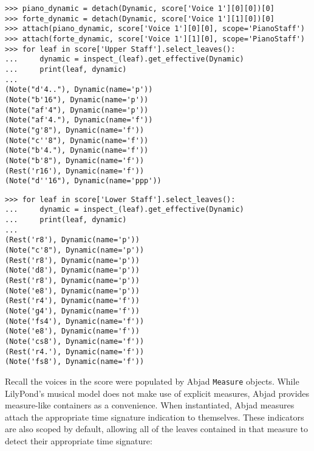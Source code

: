 \begin{abjadbookoutput}
\begin{singlespacing}
\vspace{-0.5\baselineskip}
\begin{verbatim}
>>> piano_dynamic = detach(Dynamic, score['Voice 1'][0][0])[0]
>>> forte_dynamic = detach(Dynamic, score['Voice 1'][1][0])[0]
>>> attach(piano_dynamic, score['Voice 1'][0][0], scope='PianoStaff')
>>> attach(forte_dynamic, score['Voice 1'][1][0], scope='PianoStaff')
>>> for leaf in score['Upper Staff'].select_leaves():
...     dynamic = inspect_(leaf).get_effective(Dynamic)
...     print(leaf, dynamic)
...
(Note("d'4.."), Dynamic(name='p'))
(Note("b'16"), Dynamic(name='p'))
(Note("af'4"), Dynamic(name='p'))
(Note("af'4."), Dynamic(name='f'))
(Note("g'8"), Dynamic(name='f'))
(Note("c''8"), Dynamic(name='f'))
(Note("b'4."), Dynamic(name='f'))
(Note("b'8"), Dynamic(name='f'))
(Rest('r16'), Dynamic(name='f'))
(Note("d''16"), Dynamic(name='ppp'))
\end{verbatim}
\begin{verbatim}
>>> for leaf in score['Lower Staff'].select_leaves():
...     dynamic = inspect_(leaf).get_effective(Dynamic)
...     print(leaf, dynamic)
...
(Rest('r8'), Dynamic(name='p'))
(Note("c'8"), Dynamic(name='p'))
(Rest('r8'), Dynamic(name='p'))
(Note('d8'), Dynamic(name='p'))
(Rest('r8'), Dynamic(name='p'))
(Note('e8'), Dynamic(name='p'))
(Rest('r4'), Dynamic(name='f'))
(Note('g4'), Dynamic(name='f'))
(Note('fs4'), Dynamic(name='f'))
(Note('e8'), Dynamic(name='f'))
(Note('cs8'), Dynamic(name='f'))
(Rest('r4.'), Dynamic(name='f'))
(Note('fs8'), Dynamic(name='f'))
\end{verbatim}
\end{singlespacing}
\end{abjadbookoutput}

\noindent Recall the voices in the score were populated by Abjad
\texttt{Measure} objects. While LilyPond's musical model does not make use of
explicit measures, Abjad provides measure-like containers as a convenience.
When instantiated, Abjad measures attach the appropriate time signature
indication to themselves. These indicators are also scoped by default, allowing
all of the leaves contained in that measure to detect their appropriate time
signature:

\begin{comment}
<abjad>
measure_1 = score['Voice 1'][0]
measure_2 = score['Voice 1'][1]
inspect_(measure_1).get_indicator(TimeSignature)
for leaf in measure_1.select_leaves():
    time_signature = inspect_(leaf).get_effective(TimeSignature)
    print(leaf, time_signature)

inspect_(measure_2).get_indicator(TimeSignature)
for leaf in measure_2.select_leaves():
    time_signature = inspect_(leaf).get_effective(TimeSignature)
    print(leaf, time_signature)

</abjad>
\end{comment}

